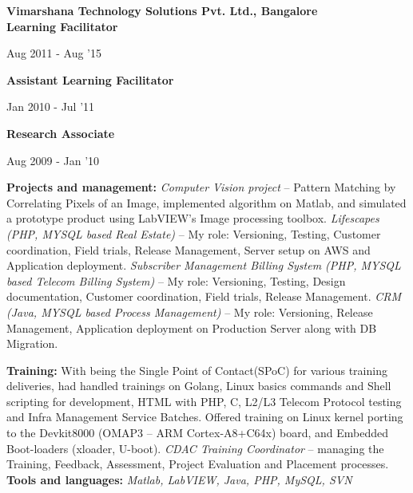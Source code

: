 \documentclass[10pt]{article}
\newenvironment{innerlist}[1][\enskip\textbullet]%
        {\begin{compactitem}[#1]}{\end{compactitem}}
\begin{document}
\textbf{Vimarshana Technology Solutions Pvt. Ltd., Bangalore} \\ \textbf{Learning Facilitator} \\ 
\vspace{-35pt} \begin{flushright} {Aug 2011 - Aug '15} \end{flushright}
\textbf{Assistant Learning Facilitator} \\
\vspace*{-36pt} \begin{flushright} {Jan 2010 -    Jul '11} \end{flushright}
\textbf{Research Associate} \\
\vspace*{-35pt} \begin{flushright} {Aug 2009 -   Jan '10} \end{flushright}
\vspace*{5pt}

\vspace*{-2pt} 
\begin{innerlist} \item \textbf{Projects and management:}
\subitem	\emph {Computer Vision project} -- Pattern Matching by Correlating Pixels of an Image, implemented algorithm on Matlab, and simulated a prototype product using LabVIEW’s Image processing toolbox.
\subitem	\emph {Lifescapes (PHP, MYSQL based Real Estate)} – My role: Versioning, Testing, Customer coordination, Field trials, Release Management, Server setup on AWS and Application deployment.
\subitem	\emph {Subscriber Management Billing System (PHP, MYSQL based Telecom Billing System)} – My role: Versioning, Testing, Design documentation, Customer coordination, Field trials, Release Management.
\subitem	\emph {CRM (Java, MYSQL based Process Management)} – My role: Versioning, Release Management, Application deployment on Production Server along with DB Migration.
\item \textbf{Training:}
\subitem	With being the Single Point of Contact(SPoC) for various training deliveries, had handled trainings on Golang, Linux basics commands and Shell scripting for development, HTML with PHP, C, L2/L3 Telecom Protocol testing and Infra Management Service Batches.
\subitem	Offered training on Linux kernel porting to the Devkit8000 (OMAP3 -- ARM Cortex-A8+C64x) board, and Embedded Boot-loaders (xloader, U-boot).
\subitem	\emph {CDAC Training Coordinator} – managing the Training, Feedback, Assessment, Project Evaluation and Placement processes.
 \\
\textbf{Tools and languages:} \emph{Matlab, LabVIEW, Java, PHP, MySQL, SVN}

\end{innerlist}  \vspace*{10pt}
\end{document}
